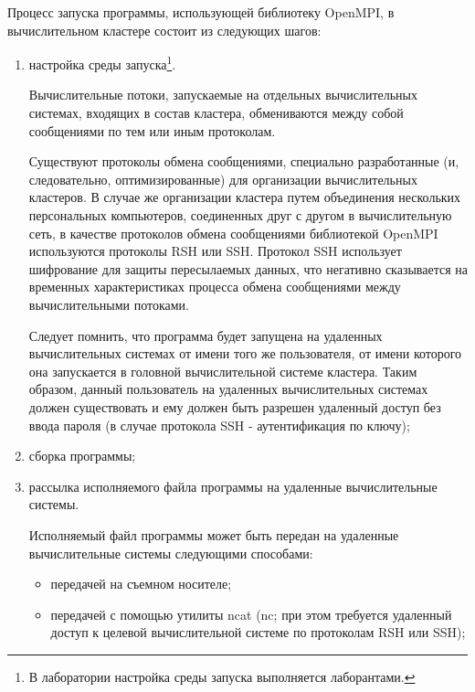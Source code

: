 Процесс запуска программы, использующей библиотеку OpenMPI, в вычислительном кластере состоит из следующих шагов:

\begin{enumerate}

	\item настройка среды запуска\footnote{В лаборатории настройка среды запуска выполняется лаборантами.}.

	Вычислительные потоки, запускаемые на отдельных вычислительных системах, входящих в состав кластера, обмениваются между собой сообщениями по тем или иным протоколам.

	Существуют протоколы обмена сообщениями, специально разработанные (и, следовательно, оптимизированные) для организации вычислительных кластеров. В случае же организации кластера путем объединения нескольких персональных компьютеров, соединенных друг с другом в вычислительную сеть, в качестве протоколов обмена сообщениями библиотекой OpenMPI используются протоколы RSH или SSH. Протокол SSH использует шифрование для защиты пересылаемых данных, что негативно сказывается на временных характеристиках процесса обмена сообщениями между вычислительными потоками.

	Следует помнить, что программа будет запущена на удаленных вычислительных системах от имени того же пользователя, от имени которого она запускается в головной вычислительной системе кластера. Таким образом, данный пользователь на удаленных вычислительных системах должен существовать и ему должен быть разрешен удаленный доступ без ввода пароля (в случае протокола SSH - аутентификация по ключу);

	\item сборка программы;

	\item рассылка исполняемого файла программы на удаленные вычислительные системы.

	Исполняемый файл программы может быть передан на удаленные вычислительные системы следующими способами:

	\begin{itemize}

		\item передачей на съемном носителе;
		\item передачей с помощью утилиты ncat (nc; при этом требуется удаленный доступ к целевой вычислительной системе по протоколам RSH или SSH);

	\end{itemize}


\end{enumerate}
